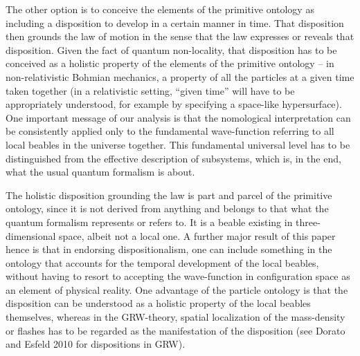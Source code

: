 \documentclass[12pt]{article}
\theoremstyle{definition}
\begin{document}
The other option is to conceive the elements of the primitive ontology as including a disposition to develop in a certain manner in time. That disposition then grounds the law of motion in the sense that the law expresses or reveals that disposition. Given the fact of quantum non-locality, that disposition has to be conceived as a holistic property of the elements of the primitive ontology -- in non-relativistic Bohmian mechanics, a property of all the particles at a given time taken together (in a relativistic setting, ``given time'' will have to be appropriately understood, for example by specifying a space-like hypersurface). One important message of our analysis is that the nomological interpretation can be consistently applied only to the fundamental wave-function referring to all local beables in the universe together. This fundamental universal level has to be distinguished from the effective description of subsystems, which is, in the end, what the usual quantum formalism is about.

The holistic disposition grounding the law is part and parcel of the primitive ontology, since it is not derived from anything and belongs to that what the quantum formalism represents or refers to. It is a beable existing in three-dimensional space, albeit not a local one. A further major result of this paper hence is that in endorsing dispositionalism, one can include something in the ontology that accounts for the temporal development of the local beables, without having to resort to accepting the wave-function in configuration space as an element of physical reality. One advantage of the particle ontology is that the disposition can be understood as a holistic property of the local beables themselves, whereas in the GRW-theory, spatial localization of the mass-density or flashes has to be regarded as the manifestation of the disposition (see Dorato and Esfeld 2010 for dispositions in GRW).
\end{document}

